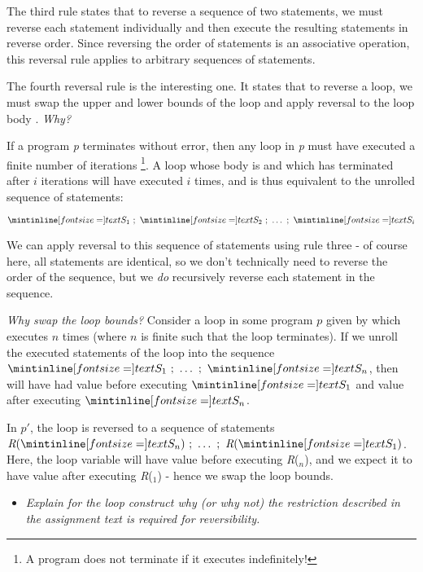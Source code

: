 \medskip

The third rule states that to reverse a sequence of two statements, we must
reverse each statement individually and then execute the resulting statements in
reverse order. Since reversing the order of statements is an associative
operation, this reversal rule applies to arbitrary sequences of statements.

\bigskip

The fourth reversal rule is the interesting one. It states that to reverse a
 loop, we must swap the upper and lower bounds of the loop and apply
reversal to the loop body . \emph{Why?}

\smallskip

If a program \emph{p} terminates without error, then any loop in \emph{p} must
have executed a finite number of iterations \footnote{A program does not
terminate if it executes indefinitely!}. A loop whose body is  and which
has terminated after $i$ iterations will have executed  $i$ times, and is
thus equivalent to the unrolled sequence of statements:

$$
\ms{S}_1 \ ;\ \ms{S}_2\ ;\ \dots\ ;\ \ms{S}_i
$$

\noindent We can apply reversal to this sequence of statements using rule three - of
course here, all statements are identical, so we don't technically need to
reverse the order of the sequence, but we \emph{do} recursively reverse each
statement in the sequence. %

\medskip

\emph{Why swap the loop bounds?} Consider a loop in some program $p$ given by
 which executes $n$ times (where $n$ is finite such
that the loop terminates). If we unroll the executed statements of the loop into
the sequence $\ms{S}_1\ ;\  \dots \ ;\ \ms{S}_n$, then  will have had
value  before executing $\ms{S}_1$ and value  after executing
$\ms{S}_n$.

\smallskip

In $p'$, the loop is reversed to a sequence of statements $\textit{R}(\ms{S}_n)\ ;\  \dots \
;\ \textit{R}(_1)$. Here, the loop variable  will have value  before
executing \textit{R}($_n$), and we expect it to have value \ms{a} after executing
\textit{R}(\ms{S}$_1$) - hence we swap the loop bounds.

\sectend

\newpage

\begin{itemize}
  \item \emph{Explain for the loop construct why (or why not) the restriction
    described in the assignment text is required for reversibility.}
\end{itemize}

